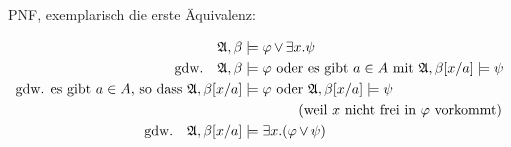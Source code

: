 PNF, exemplarisch die erste Äquivalenz:

\begin{align}
  \mathfrak{A}, \beta &\models \varphi \operatorname{\vee} \exists x.\psi \\
  \text{gdw.}\quad \mathfrak{A}, \beta &\models \varphi\ \text{oder es gibt}\ a\in A\ \text{mit}\ \mathfrak{A}, \beta[x/a] \models \psi \\
  \text{gdw. es gibt $a\in A$, so dass}\ \mathfrak{A}, \beta[x/a] &\models \varphi\ \text{oder}\ \mathfrak{A}, \beta[x/a] \models \psi\\
      & \qquad\qquad\text{(weil $x$ nicht frei in $\varphi$ vorkommt)} \\
  \text{gdw.}\quad \mathfrak{A}, \beta[x/a] &\models \exists x.(\varphi \operatorname{\vee} \psi)
\end{align}

